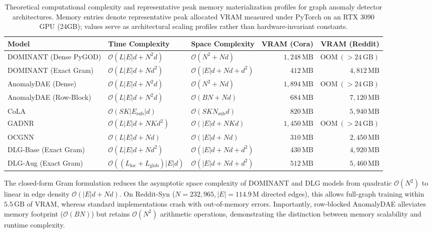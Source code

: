 \documentclass[11pt,a4paper]{article}
\begin{document}
\begin{table}[htbp]
\centering\footnotesize\setlength{\tabcolsep}{3pt}
\caption{Theoretical computational complexity and representative peak memory materialization profiles for graph anomaly detector architectures. Memory entries denote representative peak allocated VRAM measured under PyTorch on an RTX 3090 GPU (24GB); values serve as architectural scaling profiles rather than hardware-invariant constants.}
\label{tab:complexity_comparison}
\begin{tabularx}{\textwidth}{lXXrr}\toprule
\textbf{Model} & \textbf{Time Complexity} & \textbf{Space Complexity} & \textbf{VRAM (Cora)} & \textbf{VRAM (Reddit)} \\\midrule
DOMINANT (Dense PyGOD) & $\mathcal{O}(L |E| d + N^2 d)$ & $\mathcal{O}(N^2 + N d)$ & $1,248\,\mathrm{MB}$ & $\mathrm{OOM}\ (>24\,\mathrm{GB})$ \\
DOMINANT (Exact Gram) & $\mathcal{O}(L |E| d + N d^2)$ & $\mathcal{O}(|E| d + N d + d^2)$ & $412\,\mathrm{MB}$ & $4,812\,\mathrm{MB}$ \\
AnomalyDAE (Dense) & $\mathcal{O}(L |E| d + N^2 d)$ & $\mathcal{O}(N^2 + N d)$ & $1,894\,\mathrm{MB}$ & $\mathrm{OOM}\ (>24\,\mathrm{GB})$ \\
AnomalyDAE (Row-Block) & $\mathcal{O}(L |E| d + N^2 d)$ & $\mathcal{O}(B N + N d)$ & $684\,\mathrm{MB}$ & $7,120\,\mathrm{MB}$ \\
CoLA & $\mathcal{O}(S K |E_{\mathrm{sub}}| d)$ & $\mathcal{O}(S K N_{\mathrm{sub}} d)$ & $820\,\mathrm{MB}$ & $5,940\,\mathrm{MB}$ \\
GADNR & $\mathcal{O}(L |E| d + N K d^2)$ & $\mathcal{O}(|E| d + N K d)$ & $1,450\,\mathrm{MB}$ & $\mathrm{OOM}\ (>24\,\mathrm{GB})$ \\
OCGNN & $\mathcal{O}(L |E| d + N d)$ & $\mathcal{O}(|E| d + N d)$ & $310\,\mathrm{MB}$ & $2,450\,\mathrm{MB}$ \\
DLG-Base (Exact Gram) & $\mathcal{O}(L |E| d + N d^2)$ & $\mathcal{O}(|E| d + N d + d^2)$ & $430\,\mathrm{MB}$ & $4,920\,\mathrm{MB}$ \\
DLG-Aug (Exact Gram) & $\mathcal{O}((L_{\mathrm{loc}} + L_{\mathrm{glob}}) |E| d)$ & $\mathcal{O}(|E| d + N d + d^2)$ & $512\,\mathrm{MB}$ & $5,460\,\mathrm{MB}$ \\\bottomrule
\end{tabularx}
\end{table}

The closed-form Gram formulation reduces the asymptotic space complexity of DOMINANT and DLG models from quadratic $\mathcal{O}(N^2)$ to linear in edge density $\mathcal{O}(|E| d + N d)$. On Reddit-Syn ($N=232,965, |E|=114.9\,\mathrm{M}$ directed edges), this allows full-graph training within $5.5\,\mathrm{GB}$ of VRAM, whereas standard implementations crash with out-of-memory errors. Importantly, row-blocked AnomalyDAE alleviates memory footprint ($\mathcal{O}(B N)$) but retains $\mathcal{O}(N^2)$ arithmetic operations, demonstrating the distinction between memory scalability and runtime complexity.
\end{document}
